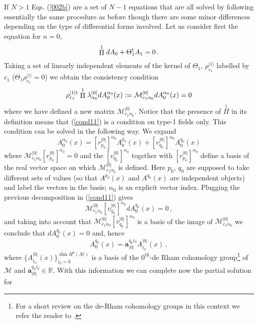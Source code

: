 \documentclass[prd,a4paper,twocolumn,amssymb,amsmath,nofootinbib,showpacs]{revtex4}
\begin{document}
If $N>1$ Eqs. (\ref{002b}) are a set of $N-1$ equations that are
all solved by following essentially the same procedure as before
though there are some minor differences depending on the type of
differential  forms involved. Let us consider first the equation
for $n=0$,
$$
\stackrel{1}{\Pi}dA_0+\Theta_{1}^{\rm{t}}A_{1}=0\,.
$$
Taking a set of linearly independent elements of the kernel of
$\Theta_1$, $\rho_{c_1}^{|1|}$ labelled by $c_1$
($\Theta_1\rho_{c_1}^{|1|}=0$) we obtain the consistency condition
\begin{equation}
\rho_{c_1}^{|1|\rm{t}}\stackrel{1}{\Pi}
\lambda_{\alpha_0}^{|0|}dA_0^{\alpha_0}(x):=
\mathcal{M}_{c_1\alpha_0}^{|0|}dA_0^{\alpha_0}(x)=0\label{cond11}
\end{equation}
where we have defined a new matrix
$\mathcal{M}_{c_1\alpha_0}^{|0|}$. Notice that the presence of
$\stackrel{1}{\Pi}$ in its definition means that (\ref{cond11}) is
a condition on type-1 fields only. This condition can be solved in
the following way. We expand
$$
A_0^{\alpha_0}(x)=[r^{|0|}_{p_0}]^{\alpha_0}A_0^{p_0}(x)+
[v^{|0|}_{q_0}]^{\alpha_0} A_0^{q_0}(x)
$$
where
$\mathcal{M}_{c_1\alpha_0}^{|0|}[r^{|0|}_{p_0}]^{\alpha_0}=0$ and
the $[v^{|0|}_{q_0}]^{\alpha_0}$ together with
$[r^{|0|}_{p_0}]^{\alpha_0}$ define a basis of the real vector
space on which $\mathcal{M}_{c_1\alpha_0}^{|0|}$ is defined. Here
$p_0$, $q_0$ are supposed to take different sets of values (so
that $A^{p_0}(x)$ and $A^{q_0}(x)$ are independent objects) and
label the vectors in the basis; $\alpha_0$ is an explicit vector
index. Plugging the previous decomposition in (\ref{cond11}) gives
\begin{equation}
\mathcal{M}_{c_1\alpha_0}^{|0|}[v^{|0|}_{q_0}]^{\alpha_0}
dA_0^{q_0}(x)=0\,,\label{ecu homo}
\end{equation}
and taking into account that
$\mathcal{M}_{c_1\alpha_0}^{|0|}[v^{|0|}_{q_0}]^{\alpha_0}$ is a
basis of the image of $\mathcal{M}_{c_1\alpha_0}^{|0|}$ we
conclude that $dA_0^{q_0}(x)=0$ and, hence
\begin{equation}
A_0^{q_0}(x)=\mathbf{a}_{|0|}^{q_0i_0}A_{i_0}^{|0|}(x)\,,\label{cond12}
\end{equation}
where $\{A_{i_0}^{|0|}(x)\}_{i_0=0}^{\dim H^0(\mathcal{M})}$ is a
basis of the $0^{\textrm{th}}$-de Rham cohomology
group\footnote{For a short review on the de-Rham cohomology groups
in this context we refer the reader to \cite{Barbero:1999ts}.} of
$\mathcal{M}$ and $\mathbf{a}_{|0|}^{q_0i_0}\in\mathbb{R}$. With
this information we can complete now the partial solution for
\end{document}
